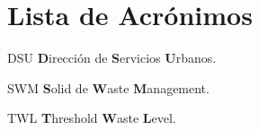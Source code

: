\chapter*{Lista de Acrónimos\hfill}
\begin{abbreviations}
    \item[DSU] \textbf{D}irección de \textbf{S}ervicios \textbf{U}rbanos.
    \item[SWM] \textbf{S}olid de \textbf{W}aste \textbf{M}anagement.
    \item[TWL] \textbf{T}hreshold \textbf{W}aste \textbf{L}evel.
\end{abbreviations}